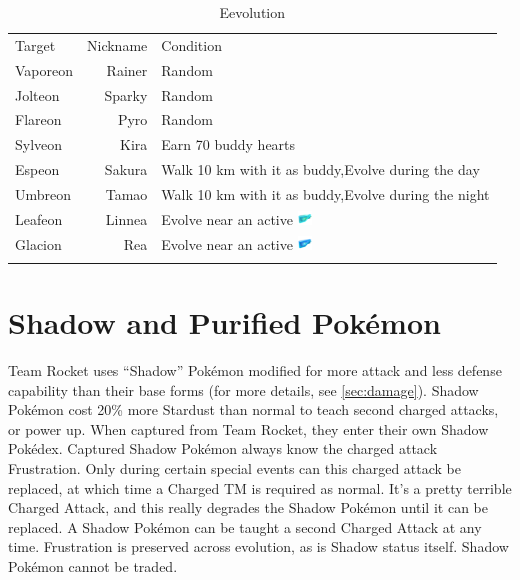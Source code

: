 \begin{table}
\centering
\begin{tabular}{lrp{}}
  Target & Nickname & Condition\\
  \Midrule
  Vaporeon & Rainer & Random\\
  Jolteon & Sparky & Random\\
  Flareon & Pyro & Random\\
  Sylveon & Kira & Earn 70 buddy hearts \\
  Espeon & Sakura & Walk 10 km with it as buddy,\newline Evolve during the day\\
  Umbreon & Tamao & Walk 10 km with it as buddy,\newline Evolve during the night\\
  Leafeon & Linnea & Evolve near an active \includegraphics[width=1em,height=1em]{images/rainylure.png} \\
  Glacion & Rea & Evolve near an active \includegraphics[width=1em,height=1em]{images/glaciallure.png} \\\\
\end{tabular}
\caption{Eevolution}
\label{table:eevee}
\end{table}

\section{Shadow and Purified Pokémon}
\label{sec:shadow}
Team Rocket uses ``Shadow'' Pokémon modified for more attack
 and less defense capability than their base forms (for more details,
 see \autoref{sec:damage}).
Shadow Pokémon cost 20\% more Stardust than normal to teach second charged attacks, or power up.
When captured from Team Rocket, they enter their own Shadow Pokédex.
Captured Shadow Pokémon always know the charged attack Frustration.
Only during certain special events can this charged attack be replaced,
 at which time a Charged TM is required as normal.
It's a pretty terrible Charged Attack, and this really degrades the
 Shadow Pokémon until it can be replaced.
A Shadow Pokémon can be taught a second Charged Attack at any time.
Frustration is preserved across evolution, as is Shadow status itself.
Shadow Pokémon cannot be traded.


